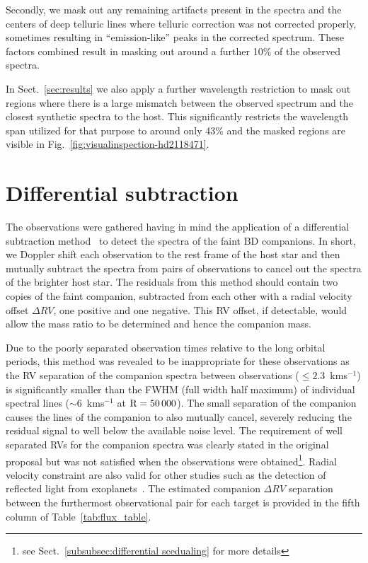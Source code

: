 \documentclass[fleqn,usenatbib]{mnras}
\begin{document}
Secondly, we mask out any remaining artifacts present in the spectra and the centers of deep telluric lines where telluric correction was not corrected properly, sometimes resulting in ``emission-like'' peaks in the corrected spectrum. These factors combined result in masking out around a further 10\% of the observed spectra. 

In Sect.~\ref{sec:results} we also apply a further wavelength restriction to mask out regions where there is a large mismatch between the observed spectrum and the closest synthetic spectra to the host. This significantly restricts the wavelength span utilized for that purpose to around only 43\% and the masked regions are visible in Fig.~\ref{fig:visualinspection-hd2118471}. 


\section{Differential subtraction}
\label{sec:spec_diff}

The observations were gathered having in mind the application of a differential subtraction method~\citep[e.g.][]{ferluga_separating_1997, kostogryz_spectral_2013} to detect the spectra of the faint BD companions. In short, we Doppler shift each observation to the rest frame of the host star and then mutually subtract the spectra from pairs of observations to cancel out the spectra of the brighter host star. The residuals from this method should contain two copies of the faint companion, subtracted from each other with a radial velocity offset \(\Delta RV\), one positive and one negative. This RV offset, if detectable, would allow the mass ratio to be determined and hence the companion mass. 

Due to the poorly separated observation times relative to the long orbital periods, this method was revealed to be inappropriate for these observations as the RV separation of the companion spectra between observations (\(\le 2.3\)~kms\(^{-1}\)) is significantly smaller than the FWHM (full width half maximum) of individual spectral lines (\(\sim\)6~kms\(^{-1}\) at \(\rm R=50\,000\)).  The small separation of the companion causes the lines of the companion to also mutually cancel, severely reducing the residual signal to well below the available noise level. The requirement of well separated RVs for the companion spectra was clearly stated in the original proposal but was not satisfied when the observations were obtained\footnote{see Sect.~\ref{subsubsec:differential scedualing} for more details}. Radial velocity constraint are also valid for other studies such as the detection of reflected light from exoplanets~\cite{martins_evidence_2015}. The estimated companion \(\Delta RV\) separation between the furthermost observational pair for each target is provided in the fifth column of Table~\ref{tab:flux_table}. 
\end{document}
